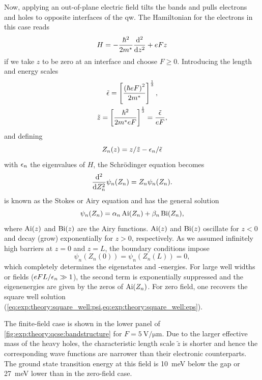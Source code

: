 Now, applying an out-of-plane electric field tilts the bands and pulls electrons and holes to opposite interfaces of the \gls{qw}.
The Hamiltonian for the electrons in this case reads~\cite{Rabinovitch1971,Miller1985,Davies2009}
\begin{equation}\label{eq:exp:theory:qcse:hamiltonian}
    H = -\frac{\hbar^2}{2m^\ast}\dv[2]{z} + eFz
\end{equation}
if we take $z$ to be zero at an interface and choose $F \geq 0$.
Introducing the length and energy scales~\cite{Davies2009}
\begin{gather}
    \tilde{\epsilon} = \left[\frac{\left(\hbar eF\right)^2}{2m^\ast}\right]^{\frac{1}{3}}, \\
    \tilde{z} = \left[\frac{\hbar^2}{2m^\ast eF}\right]^{\frac{1}{3}} = \frac{\tilde{\epsilon}}{eF},
\end{gather}
and defining
\begin{equation}
    Z_n(z) = z/\tilde{z} - \epsilon_n/\tilde{\epsilon}
\end{equation}
with $\epsilon_n$ the eigenvalues of $H$, the Schrödinger equation becomes~\cite{Rabinovitch1971}
\begin{equation}\label{eq:exp:theory:qcse:se}
    \dv[2]{Z_n}\psi_n(Z_n) = Z_n\psi_n(Z_n).
\end{equation}
 is known as the Stokes or Airy equation and has the general solution
\begin{equation}
    \psi_n(Z_n) = \alpha_n\operatorname{Ai}(Z_n) + \beta_n\operatorname{Bi}(Z_n),
\end{equation}
where $\operatorname{Ai}(z)$ and $\operatorname{Bi}(z)$ are the Airy functions.
$\operatorname{Ai}(z)$ and $\operatorname{Bi}(z)$ oscillate for $z < 0$ and decay (grow) exponentially for $z > 0$, respectively.
As we assumed infinitely high barriers at $z = 0$ and $z = L$, the boundary conditions impose
\begin{equation}
    \psi_n(Z_n(0)) = \psi_n(Z_n(L)) = 0,
\end{equation}
which completely determines the eigenstates and -energies.
For large well widths or fields ($eFL/\epsilon_n\gg 1$), the second term is exponentially suppressed and the eigenenergies are given by the zeros of $\operatorname{Ai}(Z_n)$.
For zero field, one recovers the square well solution (\cref{eq:exp:theory:square_well:psi,eq:exp:theory:square_well:eps}).

The finite-field case is shown in the lower panel of \cref{fig:exp:theory:qcse:bandstructure} for $F=\qty{5}{\volt\per\micro\meter}$.
Due to the larger effective mass of the heavy holes, the characteristic length scale $\tilde{z}$ is shorter and hence the corresponding wave functions are narrower than their electronic counterparts.
The ground state transition energy at this field is \qty{10}{\milli\electronvolt} below the gap or \qty{27}{\milli\electronvolt} lower than in the zero-field case.

